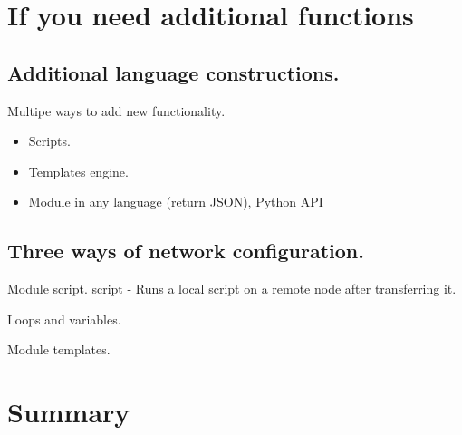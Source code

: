 \documentclass[16pt]{beamer}
\begin{document}
\section{If you need additional functions}
\subsection {Additional language constructions.}
\begin{frame}{Multipe ways to add new functionality.}
  \begin{itemize}
  \item
    Scripts.
  \item
    Templates engine.
  \item
    Module in any language (return JSON), Python API
  \end{itemize}
\end{frame}

\subsection {Three ways of network configuration.}

\begin{frame}{Module script.}
  script - Runs a local script on a remote node after transferring it.
  
\end{frame}

\begin{frame}{Loops and variables.}
  
  
\end{frame}

\begin{frame}{Module templates.}
  
  
  
\end{frame}




\section*{Summary}
\end{document}
